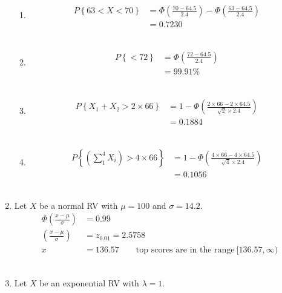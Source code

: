 \begin{enumerate}
\begin{enumerate}
			\item \begin{align}
				P \left\{63 < X < 70\right\} &= \Phi \left(\frac{70 - 64.5}{2.4}\right) - \Phi \left(\frac{63 - 64.5}{2.4}\right) \nonumber \\
				&= 0.7230
			\end{align}\\
			
			\item \begin{align}
				P \left\{ < 72\right\} &= \Phi \left(\frac{72 - 64.5}{2.4}\right) \nonumber \\
				&= 99.91\%
			\end{align}\\
			
			\item \begin{align}
				P \left\{X_1 + X_2 > 2 \times 66\right\} &= 1 - \Phi \left(\frac{2 \times 66 - 2 \times 64.5}{\sqrt{2} \times 2.4}\right) \nonumber \\
				&= 0.1884
			\end{align}\\
			
			\item \begin{align}
				P \left\{\left(\sum_{1}^{4} X_i\right) > 4 \times 66\right\} &= 1 - \Phi \left(\frac{4 \times 66 - 4 \times 64.5}{\sqrt{4} \times 2.4}\right) \nonumber \\
				&= 0.1056
			\end{align}\\
		\end{enumerate}
	
	
	\item Let $ X $ be a normal RV with $ \mu = 100 $ and $ \sigma = 14.2 $.\\
			
		\begin{align}
			\Phi\left(\frac{x - \mu}{\sigma}\right) &= 0.99 \nonumber \\
			\left(\frac{x - \mu}{\sigma}\right) &= z_{0.01} = 2.5758 \nonumber \\
			x &= 136.57 \qquad \text{top scores are in the range} \ [136.57, \infty)
		\end{align}\\
	
	
	\item Let $ X $ be an exponential RV with $ \lambda = 1 $.\\
			

\end{enumerate}
